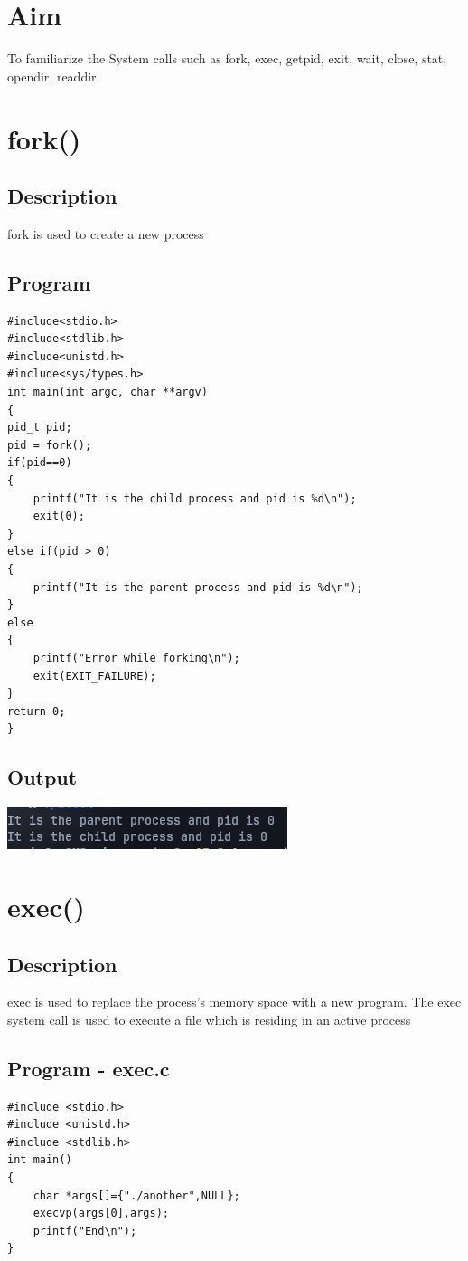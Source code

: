 
\section*{Aim}
To familiarize the System calls such as fork, exec, getpid, exit, wait, close, stat,
opendir, readdir


\section{fork()}
\subsection{Description}
fork is used to create a new process
\subsection{Program}
\begin{lstlisting}[label={list:c_program:fork}]
#include<stdio.h>
#include<stdlib.h>
#include<unistd.h>
#include<sys/types.h>
int main(int argc, char **argv)
{
pid_t pid;
pid = fork();
if(pid==0)
{
    printf("It is the child process and pid is %d\n");
    exit(0);
}
else if(pid > 0)
{
    printf("It is the parent process and pid is %d\n");
}
else
{
    printf("Error while forking\n");
    exit(EXIT_FAILURE);
}
return 0;
}
\end{lstlisting}

\subsection{Output}
\includegraphics[]{Cycle_1/Outputs/fork.png}

\section{exec()}
\subsection{Description}
exec is used to replace the process’s memory space with a new program.
The exec system call is used to execute a file which is residing in an active process
\subsection{Program - exec.c}
\begin{lstlisting}[label={list:c_program:exec}]
#include <stdio.h>
#include <unistd.h>
#include <stdlib.h>
int main()
{
    char *args[]={"./another",NULL};
    execvp(args[0],args);
    printf("End\n");
}
\end{lstlisting}
